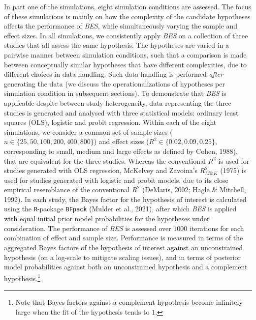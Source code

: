 \documentclass[
]{interact}
\begin{document}
In part one of the simulations, eight simulation conditions are
assessed. The focus of these simulations is mainly on how the complexity
of the candidate hypotheses affects the performance of \emph{BES}, while
simultaneously varying the sample and effect sizes. In all simulations,
we consistently apply \emph{BES} on a collection of three studies that
all assess the same hypothesis. The hypotheses are varied in a pairwise
manner between simulation conditions, such that a comparison is made
between conceptually similar hypotheses that have different
complexities, due to different choices in data handling. Such data
handling is performed \emph{after} generating the data (we discuss the
operationalizations of hypotheses per simulation condition in subsequent
sections). To demonstrate that \emph{BES} is applicable despite
between-study heterogeneity, data representing the three studies is
generated and analysed with three statistical models: ordinary least
squares (OLS), logistic and probit regression. Within each of the eight
simulations, we consider a common set of sample sizes
(\(n \in \{25, 50, 100, 200, 400, 800\}\)) and effect sizes
(\(R^2 \in \{0.02, 0.09, 0.25\}\), corresponding to small, medium and
large effects as defined by Cohen, 1988), that are equivalent for the
three studies. Whereas the conventional \(R^2\) is used for studies
generated with OLS regression, McKelvey and Zavoina's \(R^2_{M\&K}\)
(1975) is used for studies generated with logistic and probit models,
due to its close empirical resemblance of the conventional \(R^2\)
(DeMaris, 2002; Hagle \& Mitchell, 1992). In each study, the Bayes
factor for the hypothesis of interest is calculated using the
\texttt{R}-package \texttt{BFpack} (Mulder et al., 2021), after which
\emph{BES} is applied with equal initial prior model probabilities for
the hypotheses under consideration. The performance of \emph{BES} is
assessed over \(1000\) iterations for each combination of effect and
sample size. Performance is measured in terms of the aggregated Bayes
factors of the hypothesis of interest against an unconstrained
hypothesis (on a log-scale to mitigate scaling issues), and in terms of
posterior model probabilities against both an unconstrained hypothesis
and a complement hypothesis.\footnote{Note that Bayes factors against a
  complement hypothesis become infinitely large when the fit of the
  hypothesis tends to \(1\).}
\end{document}

